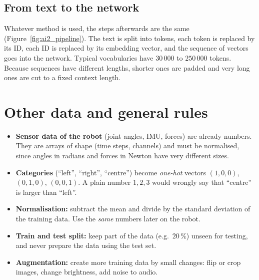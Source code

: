 \subsection*{From text to the network}
Whatever method is used, the steps afterwards are the same (Figure~\ref{fig:ai2_pipeline}). The text is split into tokens, each token is replaced by its ID, each ID is replaced by its embedding vector, and the sequence of vectors goes into the network. Typical vocabularies have $30\,000$ to $250\,000$ tokens. Because sequences have different lengths, shorter ones are padded and very long ones are cut to a fixed context length.

\begin{center}
\label{fig:ai2_pipeline}
\end{center}

\section*{Other data and general rules}
\begin{itemize}[nosep]
  \item \textbf{Sensor data of the robot} (joint angles, IMU, forces) are already numbers. They are arrays of shape (time steps, channels) and must be normalised, since angles in radians and forces in Newton have very different sizes.
  \item \textbf{Categories} (``left'', ``right'', ``centre'') become \emph{one-hot} vectors $(1,0,0)$, $(0,1,0)$, $(0,0,1)$. A plain number $1,2,3$ would wrongly say that ``centre'' is larger than ``left''.
  \item \textbf{Normalisation:} subtract the mean and divide by the standard deviation of the training data. Use the \emph{same} numbers later on the robot.
  \item \textbf{Train and test split:} keep part of the data (e.g.\ $20\,\%$) unseen for testing, and never prepare the data using the test set.
  \item \textbf{Augmentation:} create more training data by small changes: flip or crop images, change brightness, add noise to audio.
\end{itemize}

